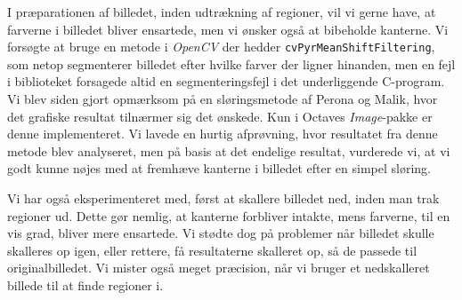 {I præparationen af billedet, inden udtrækning af regioner, vil vi gerne
have, at farverne i billedet bliver ensartede, men vi ønsker også at
bibeholde kanterne. Vi forsøgte at bruge en metode i \emph{OpenCV} der
hedder \texttt{cvPyrMeanShiftFiltering}, som netop segmenterer billedet
efter hvilke farver der ligner hinanden, men en fejl i biblioteket
forsagede altid en segmenteringsfejl i det underliggende C-program. Vi
blev siden gjort opmærksom på en sløringsmetode af Perona og
Malik\cite{perona1990scale}, hvor det grafiske resultat tilnærmer sig
det ønskede. Kun i Octaves \emph{Image}-pakke er denne implementeret. Vi
lavede en hurtig afprøvning, hvor resultatet fra denne metode blev
analyseret, men på basis at det endelige resultat, vurderede vi, at vi
godt kunne nøjes med at fremhæve kanterne i billedet efter en simpel
sløring.

Vi har også eksperimenteret med, først at skallere billedet ned, inden
man trak regioner ud. Dette gør nemlig, at kanterne forbliver intakte,
mens farverne, til en vis grad, bliver mere ensartede. Vi stødte dog på
problemer når billedet skulle skalleres op igen, eller rettere, få
resultaterne skalleret op, så de passede til originalbilledet. Vi mister
også meget præcision, når vi bruger et nedskalleret billede til at finde
regioner i.

}

%
%
%
%
%
%

